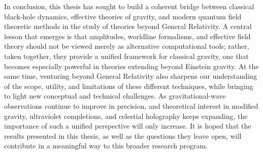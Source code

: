 \documentclass[11pt,a4paper,oneside]{book}
\begin{document}
In conclusion, this thesis has sought to build a coherent bridge between classical black-hole dynamics, effective theories of gravity, and modern quantum field theoretic methods in the study of theories beyond General Relativity. A central lesson that emerges is that amplitudes, worldline formalisms, and effective field theory should not be viewed merely as alternative computational tools; rather, taken together, they provide a unified framework for classical gravity, one that becomes especially powerful in theories extending beyond Einstein gravity. At the same time, venturing beyond General Relativity also sharpens our understanding of the scope, utility, and limitations of these different techniques, while bringing to light new conceptual and technical challenges. As gravitational-wave observations continue to improve in precision, and theoretical interest in modified gravity, ultraviolet completions, and celestial holography keeps expanding, the importance of such a unified perspective will only increase. It is hoped that the results presented in this thesis, as well as the questions they leave open, will contribute in a meaningful way to this broader research program.

\end{document}
